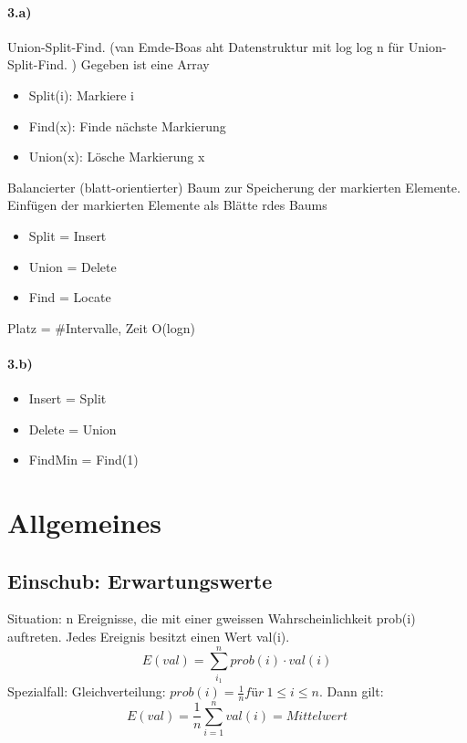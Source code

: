 \documentclass[ngerman]{scrartcl}
\begin{document}
\paragraph{3.a)} Union-Split-Find. (van Emde-Boas aht Datenstruktur mit log log n für Union-Split-Find. ) Gegeben ist eine Array
\begin{itemize}
    \item Split(i): Markiere i
    \item Find(x): Finde nächste Markierung
    \item Union(x): Lösche Markierung x
\end{itemize}
Balancierter (blatt-orientierter) Baum zur Speicherung der markierten Elemente. Einfügen der markierten Elemente als Blätte rdes Baums
\begin{itemize}
    \item Split = Insert
    \item Union = Delete
    \item Find = Locate
\end{itemize}
Platz = \#Intervalle, Zeit O(logn)
\paragraph{3.b)} 
\begin{itemize}
    \item Insert = Split
    \item Delete = Union
    \item FindMin = Find(1)
\end{itemize}

\section{Allgemeines}
\subsection{Einschub: Erwartungswerte}
Situation: n Ereignisse, die mit einer gweissen Wahrscheinlichkeit prob(i) auftreten. Jedes Ereignis besitzt einen Wert val(i). 
$$E(val) = \sum_{i_1}^{n} prob(i)\cdot val(i) $$
Spezialfall: Gleichverteilung: $ prob(i)=\frac{1}{n} für\ 1\leq i \leq n $. Dann gilt:
$$ E(val)= \frac{1}{n} \sum_{i=1}^{n}val(i) = Mittelwert $$
\end{document}
